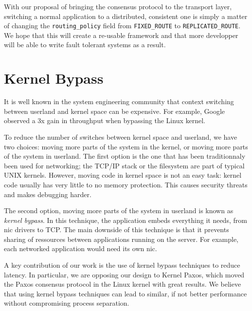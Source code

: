 \begin{lstfloat}

\end{lstfloat}

With our proposal of bringing the consensus protocol to the transport layer, switching a normal application to a distributed, consistent one is simply a matter of changing the \texttt{routing\_policy} field from \texttt{FIXED\_ROUTE} to \texttt{REPLICATED\_ROUTE}.
We hope that this will create a re-usable framework and that more developper will be able to write fault tolerant systems as a result.

\section{Kernel Bypass}

It is well known in the system engineering community that context switching between userland and kernel space can be expensive.
For example, Google observed a 3x gain in throughput when bypassing the Linux kernel\cite{maglev}.

To reduce the number of switches between kernel space and userland, we have two choices: moving more parts of the system in the kernel, or moving more parts of the system in userland.  The first option is the one that has been traditionnaly been used for networking; the TCP/IP stack or the filesystem are part of typical UNIX kernels.
However, moving code in kernel space is not an easy task: kernel code usually has very little to no memory protection.
This causes security threats and makes debugging harder.

The second option, moving more parts of the system in userland is known as \emph{kernel bypass}.
In this technique, the application embeds everything it needs, from \gls{nic} drivers to TCP.
The main downside of this technique is that it prevents sharing of ressources between applications running on the server.
For example, each networked application would need its own \gls{nic}.

A key contribution of our work is the use of kernel bypass techniques to reduce latency.
In particular, we are opposing our design to Kernel Paxos\cite{kernelpaxos}, which moved the Paxos consensus protocol in the Linux kernel with great results.
We believe that using kernel bypass techniques can lead to similar, if not better performance without compromising process separation.


